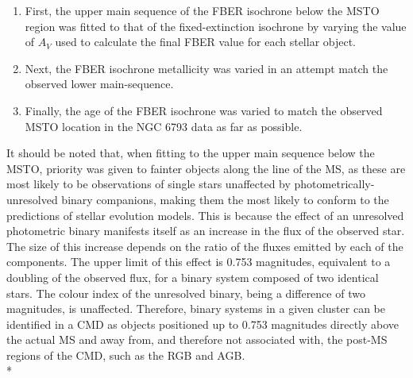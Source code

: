 \documentclass[12pt, a4paper]{report}
\begin{document}
\begin{enumerate}
\item First, the upper main sequence of the FBER isochrone below the MSTO region was fitted to that of the fixed-extinction isochrone by varying the value of $A_{V}$ used to calculate the final FBER value for each stellar object.
\item Next, the FBER isochrone metallicity was varied in an attempt match the observed lower main-sequence.
\item Finally, the age of the FBER isochrone was varied to match the observed MSTO location in the NGC 6793 data as far as possible.
\end{enumerate}

It should be noted that, when fitting  to the upper main sequence below the MSTO, priority was given to fainter objects along the line of the MS, as these are most likely to be observations of single stars unaffected by photometrically-unresolved binary companions, making them the most likely to conform to the predictions of stellar evolution models. This is because the effect of an unresolved photometric binary manifests itself as an increase in the flux of the observed star. The size of this increase depends on the ratio of the fluxes emitted by each of the components. The upper limit of this effect is 0.753 magnitudes, equivalent to a doubling of the observed flux, for a binary system composed of two identical stars. The colour index of the unresolved binary, being a difference of two magnitudes, is unaffected. Therefore, binary systems in a given cluster can be identified in a CMD as objects positioned up to 0.753 magnitudes directly above the actual MS and away from, and therefore not associated with, the post-MS regions of the CMD, such as the RGB and AGB. \\*
\end{document}
